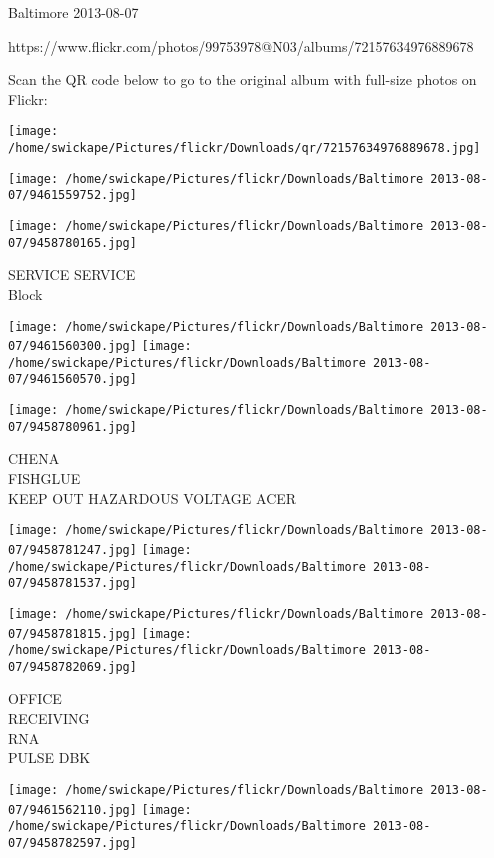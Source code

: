 \documentclass[10pt,letterpaper]{article}
\begin{document}
Baltimore 2013-08-07

https://www.flickr.com/photos/99753978@N03/albums/72157634976889678

Scan the QR code below to go to the original album with full-size photos on Flickr:

\texttt{[image: /home/swickape/Pictures/flickr/Downloads/qr/72157634976889678.jpg]}
\pagebreak

\texttt{[image: /home/swickape/Pictures/flickr/Downloads/Baltimore 2013-08-07/9461559752.jpg]}

\vspace{0.25in}
\texttt{[image: /home/swickape/Pictures/flickr/Downloads/Baltimore 2013-08-07/9458780165.jpg]}

SERVICE SERVICE\\
Block\\
\pagebreak

\texttt{[image: /home/swickape/Pictures/flickr/Downloads/Baltimore 2013-08-07/9461560300.jpg]}
\texttt{[image: /home/swickape/Pictures/flickr/Downloads/Baltimore 2013-08-07/9461560570.jpg]}

\vspace{0.25in}
\texttt{[image: /home/swickape/Pictures/flickr/Downloads/Baltimore 2013-08-07/9458780961.jpg]}

CHENA\\
FISHGLUE\\
KEEP OUT HAZARDOUS VOLTAGE ACER\\
\pagebreak

\texttt{[image: /home/swickape/Pictures/flickr/Downloads/Baltimore 2013-08-07/9458781247.jpg]}
\texttt{[image: /home/swickape/Pictures/flickr/Downloads/Baltimore 2013-08-07/9458781537.jpg]}

\texttt{[image: /home/swickape/Pictures/flickr/Downloads/Baltimore 2013-08-07/9458781815.jpg]}
\texttt{[image: /home/swickape/Pictures/flickr/Downloads/Baltimore 2013-08-07/9458782069.jpg]}

OFFICE\\
RECEIVING\\
RNA\\
PULSE DBK\\
\pagebreak

\texttt{[image: /home/swickape/Pictures/flickr/Downloads/Baltimore 2013-08-07/9461562110.jpg]}
\texttt{[image: /home/swickape/Pictures/flickr/Downloads/Baltimore 2013-08-07/9458782597.jpg]}
\end{document}
